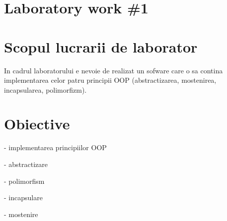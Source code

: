 \section*{Laboratory work \#1}

\section{Scopul lucrarii de laborator}
In cadrul laboratorului e nevoie de realizat un sofware care o sa contina implementarea celor patru principii OOP (abstractizarea, mostenirea, incapsularea, polimorfizm).

\section{Obiective}

- implementarea principiilor OOP

- abstractizare

- polimorfism

- incapsulare

- mostenire
\clearpage